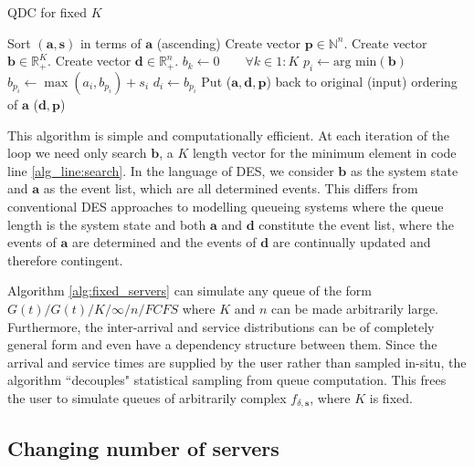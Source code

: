 \documentclass[article]{jss}
\begin{document}
\begin{algorithm}[ht!]
\caption{QDC for fixed $K$}
\label{alg:fixed_servers}
\begin{algorithmic}[1]
\State Sort $(\mathbf{a}, \mathbf{s})$ in terms of $\mathbf{a}$ (ascending)
\State Create vector $\mathbf{p} \in \mathbb{N}^{n}$.
\State Create vector $\mathbf{b} \in \mathbb{R}_{+}^{K}$. 
\State Create vector $\mathbf{d} \in \mathbb{R}_{+}^{n}$.
\State $b_k \leftarrow 0 \quad \quad \forall k \in 1:K $
  \State $p_i \leftarrow \text{arg min}(\mathbf{b}) $ \label{alg_line:search}
  \State $b_{p_i} \leftarrow \max(a_i, b_{p_i}) + s_i $
  \State $d_i \leftarrow b_{p_i}$ 
\EndFor 
\State Put ($\mathbf{a}, \mathbf{d}, \mathbf{p}$) back to original (input) ordering of $\mathbf{a}$ 
\State \Return ($\mathbf{d}, \mathbf{p}$)
\EndFunction
\end{algorithmic}
\end{algorithm}

This algorithm is simple and computationally efficient. At each iteration of the loop we need only search $\mathbf{b}$, a $K$ length vector for the minimum element in code line \ref{alg_line:search}. In the language of DES, we consider $\mathbf{b}$ as the system state and $\mathbf{a}$ as the event list, which are all determined events. This differs from conventional DES approaches to modelling queueing systems where the queue length is the system state and both $\mathbf{a}$ and $\mathbf{d}$ constitute the event list, where the events of $\mathbf{a}$ are determined and the events of $\mathbf{d}$ are continually updated and therefore contingent.  

Algorithm \ref{alg:fixed_servers} can simulate any queue of the form $G(t)/G(t)/K/\infty/n/FCFS$ where $K$ and $n$ can be made arbitrarily large. Furthermore, the inter-arrival and service distributions can be of completely general form and even have a dependency structure between them. Since the arrival and service times are supplied by the user rather than sampled in-situ, the algorithm ``decouples" statistical sampling from queue computation. This frees the user to simulate queues of arbitrarily complex $f_{\delta, \mathbf{s}}$, where $K$ is fixed. 

\subsection{Changing number of servers}
\end{document}

